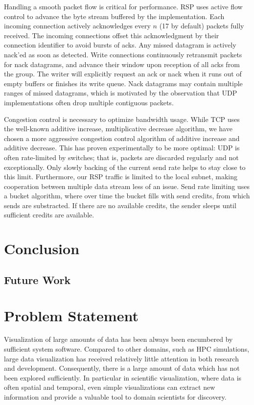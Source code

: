 Handling a smooth packet flow is critical for performance. RSP uses active flow
control to advance the byte stream buffered by the implementation. Each incoming
connection actively acknowledges every $n$ (17 by default) packets fully
received. The incoming connections offset this acknowledgment by their
connection identifier to avoid bursts of acks. Any missed datagram is actively
nack'ed as soon as detected. Write connections continuously retransmit packets
for nack datagrams, and advance their window upon reception of all acks from the
group. The writer will explicitly request an ack or nack when it runs out of
empty buffers or finishes its write queue. Nack datagrams may contain multiple
ranges of missed datagrams, which is motivated by the observation that UDP
implementations often drop multiple contiguous packets.

Congestion control is necessary to optimize bandwidth usage. While TCP uses the
well-known additive increase, multiplicative decrease algorithm, we have chosen
a more aggressive congestion control algorithm of additive increase and additive
decrease. This has proven experimentally to be more optimal: UDP is often
rate-limited by switches; that is, packets are discarded regularly and not
exceptionally. Only slowly backing of the current send rate helps to stay close
to this limit. Furthermore, our RSP traffic is limited to the local subnet,
making cooperation between multiple data stream less of an issue. Send rate
limiting uses a bucket algorithm, where over time the bucket fills with send
credits, from which sends are substracted. If there are no available credits,
the sender sleeps until sufficient credits are available.

\chapter{Conclusion}

\section{Future Work}



 \chapter{Problem Statement}

 Visualization of large amounts of data has been always been encumbered by
 sufficient system software. Compared to other domains, such as HPC simulations,
 large data visualization has received relatively little attention in both
 research and development. Consequently, there is a large amount of data which
 has not been explored sufficiently. In particular in scientific visualization,
 where data is often spatial and temporal, even simple visualizations can extract
 new information and provide a valuable tool to domain scientists for discovery.

